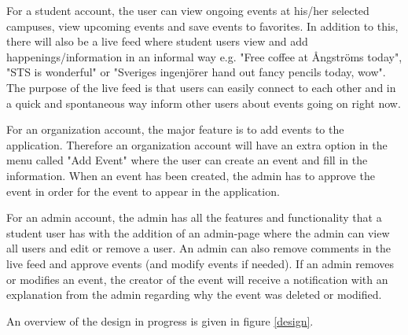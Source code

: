 \documentclass[12pt, oneside]{article}   	%
\begin{document}
For a student account, the user can view ongoing events at his/her selected campuses, view upcoming events and save events to favorites. In addition to this, there will also be a live feed where student users view and add happenings/information in an informal way e.g. "Free coffee at \AA ngstr\"{o}ms today", "STS is wonderful" or "Sveriges ingenj\"{o}rer hand out fancy pencils today, wow". The purpose of the live feed is that users can easily connect to each other and in a quick and spontaneous way inform other users about events going on right now. 

For an organization account, the major feature is to add events to the application. Therefore an organization account will have an extra option in the menu called "Add Event" where the user can create an event and fill in the information. When an event has been created, the admin has to approve the event in order for the event to appear in the application. 

For an admin account, the admin has all the features and functionality that a student user has with the addition of an admin-page where the admin can view all users and edit or remove a user. An admin can also remove comments in the live feed and approve events (and modify events if needed). If an admin removes or modifies an event, the creator of the event will receive a notification with an explanation from the admin regarding why the event was deleted or modified. 

An overview of the design in progress is given in figure \ref{design}. 
\end{document}

